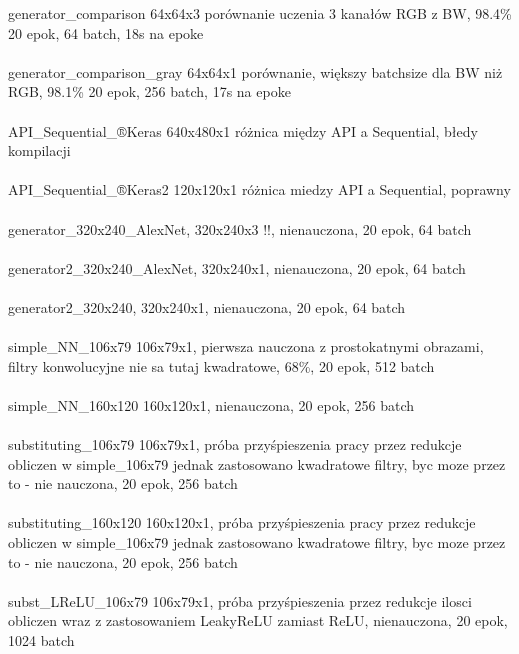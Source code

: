 generator_comparison 64x64x3 porównanie uczenia 3 kanałów RGB z BW, 98.4\% 20 epok, 64 batch, 18s na epoke \\\\

generator_comparison_gray 64x64x1 porównanie, większy batchsize dla BW niż RGB, 98.1\% 20 epok, 256 batch, 17s na epoke \\\\

API_Sequential_®Keras  640x480x1 różnica między API a Sequential, błedy kompilacji \\\\

API_Sequential_®Keras2 120x120x1 różnica miedzy API a Sequential, poprawny \\\\

generator_320x240_AlexNet, 320x240x3 !!, nienauczona, 20 epok, 64 batch \\\\

generator2_320x240_AlexNet, 320x240x1, nienauczona, 20 epok, 64 batch \\\\

generator2_320x240, 320x240x1, nienauczona, 20 epok, 64 batch \\\\

simple_NN_106x79 106x79x1, pierwsza nauczona z prostokatnymi obrazami, filtry konwolucyjne
nie sa tutaj kwadratowe, 68\%, 20 epok, 512 batch \\\\

simple_NN_160x120 160x120x1, nienauczona, 20 epok, 256 batch \\\\

substituting_106x79 106x79x1, próba przyśpieszenia pracy przez redukcje obliczen w
simple_106x79 jednak zastosowano kwadratowe filtry, byc moze przez to - nie nauczona, 20 epok, 256 batch \\\\

substituting_160x120 160x120x1, próba przyśpieszenia pracy przez redukcje obliczen w
simple_106x79 jednak zastosowano kwadratowe filtry, byc moze przez to - nie nauczona, 20 epok, 256 batch \\\\

subst_LReLU_106x79 106x79x1, próba przyśpieszenia przez redukcje ilosci obliczen wraz
z zastosowaniem LeakyReLU zamiast ReLU, nienauczona, 20 epok, 1024 batch \\\\
